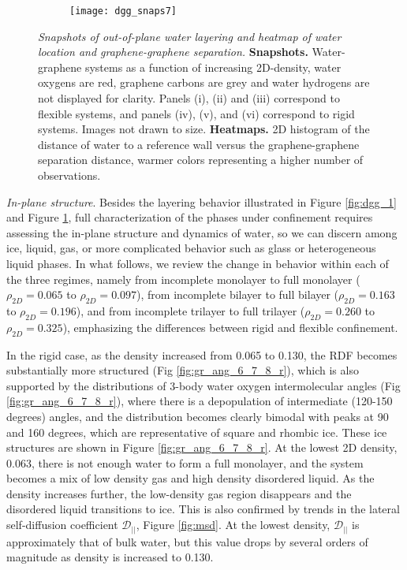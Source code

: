 \documentclass[12pt]{article}
\begin{document}
\begin{figure}[h!]
	\centering
	\begin{subfigure}[b]{0.99\textwidth}
    		\texttt{[image: dgg\_snaps7]}
  	\end{subfigure}
	\caption{\textit{Snapshots of out-of-plane water layering and heatmap of water location and graphene-graphene separation.} \textbf{Snapshots.} Water-graphene systems as a function of increasing 2D-density, water oxygens are red, graphene carbons are grey and water hydrogens are not displayed for clarity. Panels (i), (ii) and (iii) correspond to flexible systems, and panels (iv), (v), and (vi) correspond to rigid systems. Images not drawn to size. \textbf{Heatmaps.} 2D histogram of the distance of water to a reference wall versus the graphene-graphene separation distance, warmer colors representing a higher number of observations.}
	\label{fig:dgg_2}
\end{figure}


\textit{In-plane structure}. Besides the layering behavior illustrated in Figure \ref{fig:dgg_1} and Figure \ref{fig:dgg_2}, full characterization of the phases under confinement requires assessing the in-plane structure and dynamics of water, so we can discern among ice, liquid, gas, or more complicated behavior such as glass or heterogeneous liquid phases. In what follows, we review the change in behavior within each of the three regimes, namely from incomplete monolayer to full monolayer (\(\rho_{2D}=0.065\) to \(\rho_{2D}=0.097\)), from incomplete bilayer to full bilayer (\(\rho_{2D}=0.163\) to \(\rho_{2D}=0.196\)), and from incomplete trilayer to full trilayer (\(\rho_{2D}=0.260\) to \(\rho_{2D}=0.325\)), emphasizing the differences between rigid and flexible confinement.

 In the rigid case, as the density increased from 0.065 to 0.130, the RDF becomes substantially more structured (Fig \ref{fig:gr_ang_6_7_8_r}), which is also supported by the distributions of 3-body water oxygen intermolecular angles (Fig \ref{fig:gr_ang_6_7_8_r}), where there is a depopulation of intermediate (120-150 degrees) angles, and the distribution becomes clearly bimodal with peaks at 90 and 160 degrees, which are representative of square and rhombic ice. These ice structures are shown in Figure \ref{fig:gr_ang_6_7_8_r}. At the lowest 2D density, 0.063, there is not enough water to form a full monolayer, and the system becomes a mix of low density gas and high density disordered liquid. As the density increases further, the low-density gas region disappears and the disordered liquid transitions to ice. This is also confirmed by trends in the lateral self-diffusion coefficient \(\mathcal{D}_{||}\), Figure \ref{fig:msd}. At the lowest density, \(\mathcal{D}_{||}\) is approximately that of bulk water, but this value drops by several orders of magnitude as density is increased to 0.130. 
\end{document}
